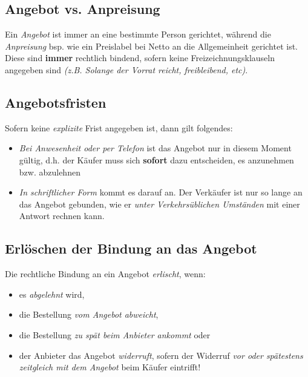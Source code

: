 \documentclass[a4paper, 12pt]{report}
\begin{document}
\subsection{Angebot vs. Anpreisung}

Ein \emph{Angebot} ist immer an eine bestimmte Person gerichtet, während die 
\emph{Anpreisung} bsp. wie ein Preislabel bei Netto an die Allgemeinheit 
gerichtet ist. Diese sind \textbf{immer} rechtlich bindend, sofern keine 
Freizeichnungsklauseln angegeben sind \emph{(z.B. \glqq Solange der Vorrat 
reicht\grqq{}, \glqq freibleibend\grqq{}, etc)}.

\subsection{Angebotsfristen}

Sofern keine \emph{explizite} Frist angegeben ist, dann gilt folgendes: 

\begin{itemize}
    \item \emph{Bei Anwesenheit oder per Telefon} ist das Angebot nur in diesem
        Moment gültig, d.h. der Käufer muss sich \textbf{sofort} dazu 
        entscheiden, es anzunehmen bzw. abzulehnen
    \item \emph{In schriftlicher Form} kommt es darauf an. Der Verkäufer ist nur 
        so lange an das Angebot gebunden, wie er \emph{unter Verkehrsüblichen 
        Umständen} mit einer Antwort rechnen kann.
\end{itemize}

\subsection{Erlöschen der Bindung an das Angebot}

Die rechtliche Bindung an ein Angebot \emph{erlischt}, wenn:

\begin{itemize}
    \item es \emph{abgelehnt} wird, 
    \item die Bestellung \emph{vom Angebot abweicht},
    \item die Bestellung \emph{zu spät beim Anbieter ankommt} oder 
    \item der Anbieter das Angebot \emph{widerruft}, sofern der Widerruf \emph{
        vor oder spätestens zeitgleich mit dem Angebot} beim Käufer 
        eintrifft!
\end{itemize}
\end{document}
